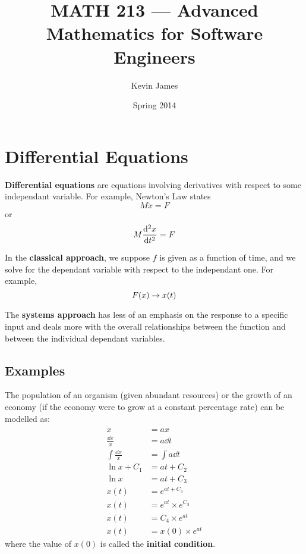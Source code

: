 \documentclass[12pt]{article}
\begin{document}
\title{MATH 213 --- Advanced Mathematics for Software Engineers}
\author{Kevin James}
\date{\vspace{-2ex}Spring 2014}
\maketitle\HRule

\tableofcontents
\newpage

\section{Differential Equations}
{\bf Differential equations} are equations involving derivatives with respect to some independant variable. For example, Newton's Law states \[ M \ddot x = F \] or \[ M \frac{{\rm d}^2 x}{{\rm d} t^2} = F \]

In the {\bf classical approach}, we suppose $f$ is given as a function of time, and we solve for the dependant variable with respect to the independant one. For example, \[ F(x) \rightarrow x(t) \]

The {\bf systems approach} has less of an emphasis on the response to a specific input and deals more with the overall relationships between the function and between the individual dependant variables.

\subsection{Examples}
The population of an organism (given abundant resources) or the growth of an economy (if the economy were to grow at a constant percentage rate) can be modelled as:
\begin{align*}
\dot x &= ax\\
\frac{\dd x}{x} &= a \dd t\\
\int \frac{\dd x}{x} &= \int a \dd t\\
\ln x + C_1 &= at + C_2\\
\ln x &= at + C_3\\
x(t) &= e^{at + C_3}\\
x(t) &= e^{at} \times e^{C_3}\\
x(t) &= C_4 \times e^{at}\\
x(t) &= x(0) \times e^{at}
\end{align*}
where the value of $x(0)$ is called the {\bf initial condition}.
\end{document}
